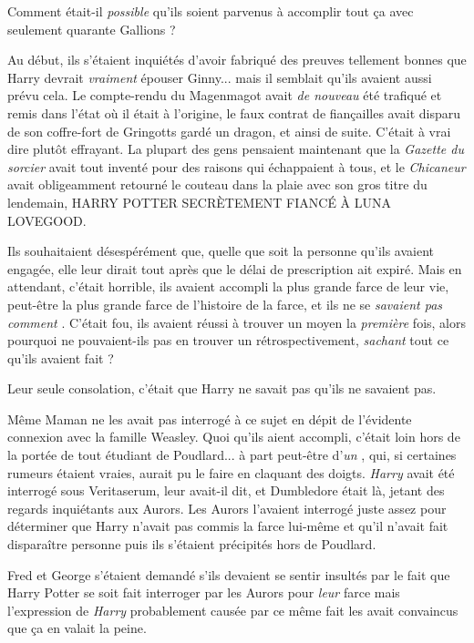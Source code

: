 Comment était-il \emph{possible}  qu'ils soient parvenus à accomplir tout ça avec seulement quarante Gallions ?

Au début, ils s'étaient inquiétés d'avoir fabriqué des preuves tellement bonnes que Harry devrait \emph{vraiment}  épouser Ginny... mais il semblait qu'ils avaient aussi prévu cela. Le compte-rendu du Magenmagot avait \emph{de nouveau } été trafiqué et remis dans l'état où il était à l'origine, le faux contrat de fiançailles avait disparu de son coffre-fort de Gringotts gardé un dragon, et ainsi de suite. C'était à vrai dire plutôt effrayant. La plupart des gens pensaient maintenant que la \emph{Gazette du sorcier}  avait tout inventé pour des raisons qui échappaient à tous, et le \emph{Chicaneur}  avait obligeamment retourné le couteau dans la plaie avec son gros titre du lendemain, HARRY POTTER SECRÈTEMENT FIANCÉ À LUNA LOVEGOOD.

Ils souhaitaient désespérément que, quelle que soit la personne qu'ils avaient engagée, elle leur dirait tout après que le délai de prescription ait expiré. Mais en attendant, c'était horrible, ils avaient accompli la plus grande farce de leur vie, peut-être la plus grande farce de l'histoire de la farce, et ils ne se \emph{savaient pas comment} . C'était fou, ils avaient réussi à trouver un moyen la \emph{première}  fois, alors pourquoi ne pouvaient-ils pas en trouver un rétrospectivement, \emph{sachant}  tout ce qu'ils avaient fait ?

Leur seule consolation, c'était que Harry ne savait pas qu'ils ne savaient pas.

Même Maman ne les avait pas interrogé à ce sujet en dépit de l'évidente connexion avec la famille Weasley. Quoi qu'ils aient accompli, c'était loin hors de la portée de tout étudiant de Poudlard... à part peut-être d'\emph{un} , qui, si certaines rumeurs étaient vraies, aurait pu le faire en claquant des doigts. \emph{Harry}  avait été interrogé sous Veritaserum, leur avait-il dit, et Dumbledore était là, jetant des regards inquiétants aux Aurors. Les Aurors l'avaient interrogé juste assez pour déterminer que Harry n'avait pas commis la farce lui-même et qu'il n'avait fait disparaître personne puis ils s'étaient précipités hors de Poudlard.

Fred et George s'étaient demandé s'ils devaient se sentir insultés par le fait que Harry Potter se soit fait interroger par les Aurors pour \emph{leur}  farce mais l'expression de \emph{Harry}  probablement causée par ce même fait les avait convaincus que ça en valait la peine.

